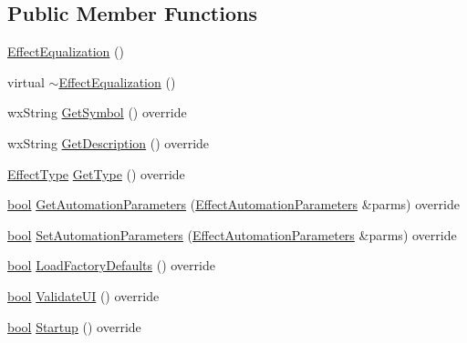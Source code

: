 \subsection*{Public Member Functions}
\begin{DoxyCompactItemize}
\item 
\hyperlink{class_effect_equalization_a5c88e89f930e8a94827a224945cba3d1}{Effect\+Equalization} ()
\item 
virtual \hyperlink{class_effect_equalization_a2a263426296dee56bbd2cbcc889f909d}{$\sim$\+Effect\+Equalization} ()
\item 
wx\+String \hyperlink{class_effect_equalization_a68b52864362138263cffe9e79ce94838}{Get\+Symbol} () override
\item 
wx\+String \hyperlink{class_effect_equalization_a1fea1cf7f0f5c8e334547299c28938c5}{Get\+Description} () override
\item 
\hyperlink{_effect_interface_8h_a4809a7bb3fd1a421902a667cc1405d43}{Effect\+Type} \hyperlink{class_effect_equalization_af48f25f528ffc9336b7dcc722d707f0d}{Get\+Type} () override
\item 
\hyperlink{mac_2config_2i386_2lib-src_2libsoxr_2soxr-config_8h_abb452686968e48b67397da5f97445f5b}{bool} \hyperlink{class_effect_equalization_ad3be9f18cd948df8b777164f5a478882}{Get\+Automation\+Parameters} (\hyperlink{class_effect_automation_parameters}{Effect\+Automation\+Parameters} \&parms) override
\item 
\hyperlink{mac_2config_2i386_2lib-src_2libsoxr_2soxr-config_8h_abb452686968e48b67397da5f97445f5b}{bool} \hyperlink{class_effect_equalization_a8a3a0756adee96ff2b570f2b7c391999}{Set\+Automation\+Parameters} (\hyperlink{class_effect_automation_parameters}{Effect\+Automation\+Parameters} \&parms) override
\item 
\hyperlink{mac_2config_2i386_2lib-src_2libsoxr_2soxr-config_8h_abb452686968e48b67397da5f97445f5b}{bool} \hyperlink{class_effect_equalization_a769f846631805c557f940353d6704a9c}{Load\+Factory\+Defaults} () override
\item 
\hyperlink{mac_2config_2i386_2lib-src_2libsoxr_2soxr-config_8h_abb452686968e48b67397da5f97445f5b}{bool} \hyperlink{class_effect_equalization_a1defcf863397160bb35f244c8e1fdfaa}{Validate\+UI} () override
\item 
\hyperlink{mac_2config_2i386_2lib-src_2libsoxr_2soxr-config_8h_abb452686968e48b67397da5f97445f5b}{bool} \hyperlink{class_effect_equalization_a61c334e6c981c3a39fb83dc0a0a4b56a}{Startup} () override
\item 

\end{DoxyCompactItemize}
